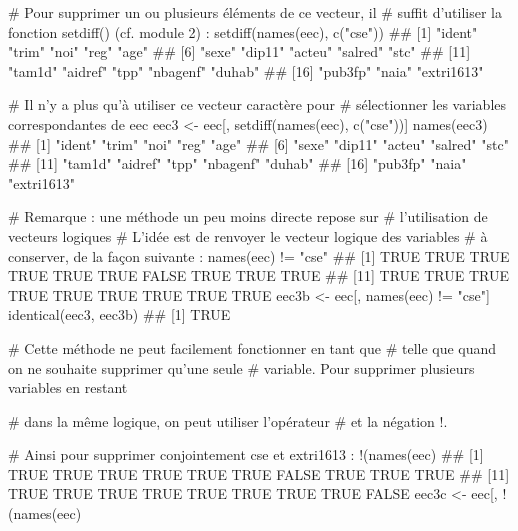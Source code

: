 \documentclass[12pt,twosided, notitlepage]{book}
\newenvironment{Shaded}{}{}
\newcommand{\KeywordTok}[1]{\textcolor[rgb]{0.00,0.00,1.00}{#1}}
\newcommand{\StringTok}[1]{\textcolor[rgb]{0.00,0.50,0.50}{#1}}
\newcommand{\CommentTok}[1]{\textcolor[rgb]{0.00,0.50,0.00}{#1}}
\newcommand{\OperatorTok}[1]{#1}
\newcommand{\NormalTok}[1]{#1}
\renewenvironment{Shaded}{\begin{snugshade}}{\end{snugshade}}
\begin{document}
\begin{enumerate}
\begin{enumerate}
\begin{Shaded}
\begin{Highlighting}[]
\CommentTok{# Pour supprimer un ou plusieurs éléments de ce vecteur, il }
\CommentTok{# suffit d'utiliser la fonction setdiff() (cf. module 2) : }
\KeywordTok{setdiff}\NormalTok{(}\KeywordTok{names}\NormalTok{(eec), }\KeywordTok{c}\NormalTok{(}\StringTok{"cse"}\NormalTok{))}
\NormalTok{  ##  [1] "ident"     "trim"      "noi"       "reg"       "age"      }
\NormalTok{  ##  [6] "sexe"      "dip11"     "acteu"     "salred"    "stc"      }
\NormalTok{  ## [11] "tam1d"     "aidref"    "tpp"       "nbagenf"   "duhab"    }
\NormalTok{  ## [16] "pub3fp"    "naia"      "extri1613"}

\CommentTok{# Il n'y a plus qu'à utiliser ce vecteur caractère pour }
\CommentTok{# sélectionner les variables correspondantes de eec}
\NormalTok{eec3 <-}\StringTok{ }\NormalTok{eec[, }\KeywordTok{setdiff}\NormalTok{(}\KeywordTok{names}\NormalTok{(eec), }\KeywordTok{c}\NormalTok{(}\StringTok{"cse"}\NormalTok{))]}
\KeywordTok{names}\NormalTok{(eec3)}
\NormalTok{  ##  [1] "ident"     "trim"      "noi"       "reg"       "age"      }
\NormalTok{  ##  [6] "sexe"      "dip11"     "acteu"     "salred"    "stc"      }
\NormalTok{  ## [11] "tam1d"     "aidref"    "tpp"       "nbagenf"   "duhab"    }
\NormalTok{  ## [16] "pub3fp"    "naia"      "extri1613"}

\CommentTok{# Remarque : une méthode un peu moins directe repose sur }
\CommentTok{# l'utilisation de vecteurs logiques }
\CommentTok{# L'idée est de renvoyer le vecteur logique des variables}
\CommentTok{# à conserver, de la façon suivante : }
\KeywordTok{names}\NormalTok{(eec) }\OperatorTok{!=}\StringTok{ "cse"}
\NormalTok{  ##  [1]  TRUE  TRUE  TRUE  TRUE  TRUE  TRUE FALSE  TRUE  TRUE  TRUE}
\NormalTok{  ## [11]  TRUE  TRUE  TRUE  TRUE  TRUE  TRUE  TRUE  TRUE  TRUE}
\NormalTok{eec3b <-}\StringTok{ }\NormalTok{eec[, }\KeywordTok{names}\NormalTok{(eec) }\OperatorTok{!=}\StringTok{ "cse"}\NormalTok{]}
\KeywordTok{identical}\NormalTok{(eec3, eec3b)}
\NormalTok{  ## [1] TRUE}

\CommentTok{# Cette méthode ne peut facilement fonctionner en tant que}
\CommentTok{# telle que quand on ne souhaite supprimer qu'une seule}
\CommentTok{# variable. Pour supprimer plusieurs variables en restant}
\CommentTok{# dans la même logique, on peut utiliser l'opérateur %
\CommentTok{# et la négation !. }

\CommentTok{# Ainsi pour supprimer conjointement cse et extri1613 : }
\OperatorTok{!}\NormalTok{(}\KeywordTok{names}\NormalTok{(eec) }\OperatorTok{%
\NormalTok{  ##  [1]  TRUE  TRUE  TRUE  TRUE  TRUE  TRUE FALSE  TRUE  TRUE  TRUE}
\NormalTok{  ## [11]  TRUE  TRUE  TRUE  TRUE  TRUE  TRUE  TRUE  TRUE FALSE}
\NormalTok{eec3c <-}\StringTok{ }\NormalTok{eec[, }\OperatorTok{!}\NormalTok{(}\KeywordTok{names}\NormalTok{(eec) }\OperatorTok{%

}}}
\end{Highlighting}
\end{Shaded}
\end{enumerate}
\end{enumerate}
\end{document}
